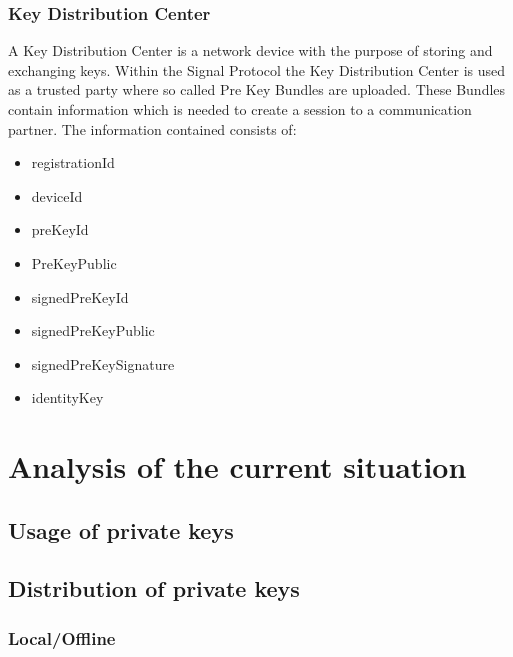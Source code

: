 \documentclass[12pt,oneside,a4paper,parskip]{scrbook}
\begin{document}
\subsection*{Key Distribution Center}
\label{subsec:KDC}

A Key Distribution Center is a network device with the purpose of storing and exchanging keys. Within the Signal Protocol the Key Distribution Center is used
as a trusted party where so called Pre Key Bundles are uploaded. These Bundles contain information which is needed to create a session to a communication partner.
The information contained consists of:
\begin{itemize}
  \item registrationId
  \item deviceId
  \item preKeyId
  \item PreKeyPublic
  \item signedPreKeyId
  \item signedPreKeyPublic
  \item signedPreKeySignature
  \item identityKey
\end{itemize}




\chapter{Analysis of the current situation}

\section{Usage of private keys}

\section{Distribution of private keys}

\subsection{Local/Offline}
\end{document}
